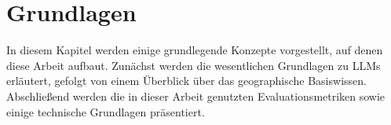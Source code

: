 \chapter{Grundlagen}
\label{ch:basics}

\newcommand{\mean}{\bar{x}_{arithm}}





In diesem Kapitel werden einige grundlegende Konzepte vorgestellt, auf denen diese Arbeit aufbaut.
Zunächst werden die wesentlichen Grundlagen zu LLMs erläutert, gefolgt von einem Überblick über das geographische Basiswissen.
Abschließend werden die in dieser Arbeit genutzten Evaluationsmetriken sowie einige technische Grundlagen präsentiert.

